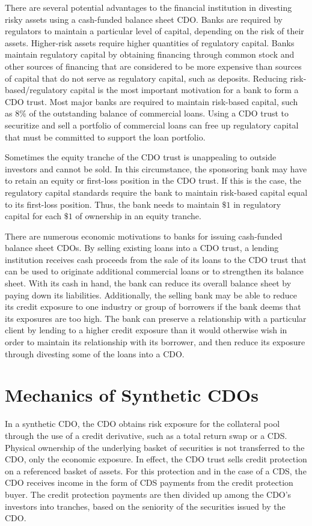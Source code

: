 \documentclass[11pt]{article}
\begin{document}
There are several potential advantages to the financial institution in divesting risky assets using a cash-funded balance sheet CDO. Banks are required by regulators to maintain a particular level of capital, depending on the risk of their assets. Higher-risk assets require higher quantities of regulatory capital. Banks maintain regulatory capital by obtaining financing through common stock and other sources of financing that are considered to be more expensive than sources of capital that do not serve as regulatory capital, such as deposits. Reducing risk-based/regulatory capital is the most important motivation for a bank to form a CDO trust. Most major banks are required to maintain risk-based capital, such as $8 \%$ of the outstanding balance of commercial loans. Using a CDO trust to securitize and sell a portfolio of commercial loans can free up regulatory capital that must be committed to support the loan portfolio.

Sometimes the equity tranche of the CDO trust is unappealing to outside investors and cannot be sold. In this circumstance, the sponsoring bank may have to retain an equity or first-loss position in the CDO trust. If this is the case, the regulatory capital standards require the bank to maintain risk-based capital equal to its first-loss position. Thus, the bank needs to maintain $\$ 1$ in regulatory capital for each $\$ 1$ of ownership in an equity tranche.

There are numerous economic motivations to banks for issuing cash-funded balance sheet CDOs. By selling existing loans into a CDO trust, a lending institution receives cash proceeds from the sale of its loans to the CDO trust that can be used to originate additional commercial loans or to strengthen its balance sheet. With its cash in hand, the bank can reduce its overall balance sheet by paying down its liabilities. Additionally, the selling bank may be able to reduce its credit exposure to one industry or group of borrowers if the bank deems that its exposures are too high. The bank can preserve a relationship with a particular client by lending to a higher credit exposure than it would otherwise wish in order to maintain its relationship with its borrower, and then reduce its exposure through divesting some of the loans into a CDO.

\section*{Mechanics of Synthetic CDOs}
In a synthetic CDO, the CDO obtains risk exposure for the collateral pool through the use of a credit derivative, such as a total return swap or a CDS. Physical ownership of the underlying basket of securities is not transferred to the CDO, only the economic exposure. In effect, the CDO trust sells credit protection on a referenced basket of assets. For this protection and in the case of a CDS, the CDO receives income in the form of CDS payments from the credit protection buyer. The credit protection payments are then divided up among the CDO's investors into tranches, based on the seniority of the securities issued by the CDO.
\end{document}
